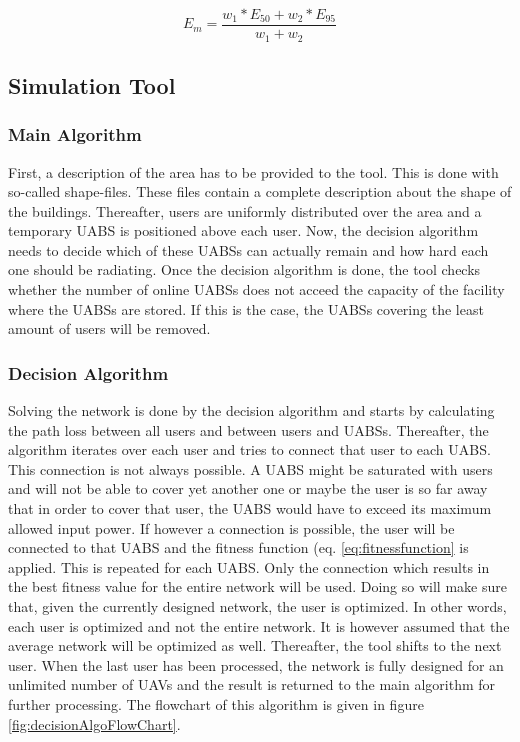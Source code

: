 \documentclass[twocolumn]{phdsymp} %
\begin{document}
\begin{equation} 
E_m = \frac{w_1 * E_{50} + w_2 * E_{95}}{w_1 + w_2}
\label{eq:em}
\end{equation}


\subsection{Simulation Tool}

\subsubsection{Main Algorithm}
First, a description of the area has to be provided to the tool. This is done with so-called shape-files.
These  files contain a complete description about the shape of the buildings. Thereafter, users are uniformly
distributed over the area and a temporary \gls{UABS} is positioned above each user. Now, the decision algorithm
needs to decide which of these \gls{UABS}s can actually remain and how hard each one should be radiating. Once the 
decision algorithm is done, the tool checks whether the number of online \gls{UABS}s does not acceed the capacity of 
the facility where the \gls{UABS}s are stored. If this is the case, the \gls{UABS}s covering the least amount of users 
will be removed.

\subsubsection{Decision Algorithm}

Solving the network is done by the decision algorithm and starts by calculating the path loss between all users and between users and \gls{UABS}s.
Thereafter, the algorithm iterates over each user and tries to connect that user to each \gls{UABS}. This connection is not always possible. A \gls{UABS} might be saturated with users and 
will not be able to cover yet another one or maybe the user is so far away that in order to cover that user, the \gls{UABS} would have to exceed its maximum allowed input power.
If however a connection is possible, the user will be connected to that \gls{UABS} and the fitness function (eq. \ref{eq:fitnessfunction} is applied. 
This is repeated for each \gls{UABS}. Only the connection which results in the best fitness value for the entire network will be used.
Doing so will make sure that, given the currently designed network, the user is optimized. In other words, each user is optimized and 
not the entire network. It is however assumed that the average network will be optimized as well.
 Thereafter, the tool shifts to the next user. 
When the last user has been processed, the network is fully designed for an unlimited number of \gls{UAV}s and the result is returned to the main algorithm for further processing.
The flowchart of this algorithm is given in figure \ref{fig:decisionAlgoFlowChart}.
\end{document}
